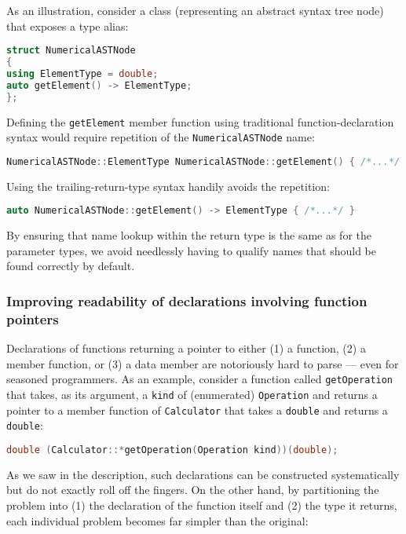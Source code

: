As an illustration, consider a class (representing an abstract syntax
tree node) that exposes a type alias:

\begin{lstlisting}[language=C++]
struct NumericalASTNode
{
using ElementType = double;
auto getElement() -> ElementType;
};
\end{lstlisting}

\noindent Defining the \texttt{getElement} member function using traditional
function-declaration syntax would require repetition of the
\texttt{NumericalASTNode} name:

\begin{lstlisting}[language=C++]
NumericalASTNode::ElementType NumericalASTNode::getElement() { /*...*/ }
\end{lstlisting}

\noindent Using the trailing-return-type syntax handily avoids the repetition:

\begin{lstlisting}[language=C++]
auto NumericalASTNode::getElement() -> ElementType { /*...*/ }
\end{lstlisting}

\noindent By ensuring that name lookup within the return type is the same as for
the parameter types, we avoid needlessly having to qualify names that
should be found correctly by default.

\subsubsection[Improving readability of declarations involving function pointers]{Improving readability of declarations involving function pointers}\label{improving-readability-of-declarations-involving-function-pointers}

Declarations of functions returning a pointer to either (1) a function, (2) a member function, or (3) a data member are notoriously hard to parse --- even for seasoned programmers. As an example, consider a function called
\texttt{getOperation} that takes, as its argument, a \texttt{kind} of
(enumerated) \texttt{Operation} and returns a pointer to a member
function of \texttt{Calculator} that takes a \texttt{double} and
returns a \texttt{double}:

\begin{lstlisting}[language=C++]
double (Calculator::*getOperation(Operation kind))(double);
\end{lstlisting}

\noindent As we saw in the description, such declarations can be constructed
systematically but do not exactly roll off the fingers. On the other
hand, by partitioning the problem into (1) the declaration of the
function itself and (2) the type it returns, each individual problem
becomes far simpler than the original:

